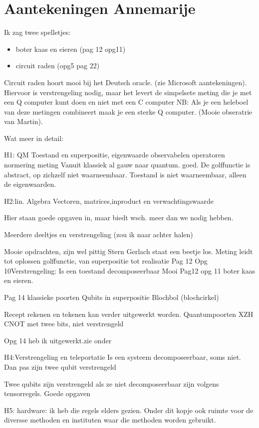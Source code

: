 \documentclass[../../main.tex]{subfiles}
\begin{document}
\onlyinsubfile{\setcounter{chapter}{8}}
\notinsubfile{}
\chapter{Aantekeningen Annemarije}

Ik zag twee spelletjes: 
\begin{itemize}[nosep]
\item boter kaas en eieren (pag 12 opg11)
\item circuit raden (opg5 pag 22)
\end{itemize}

Circuit raden hoort mooi bij het Deutsch oracle. (zie Microsoft aantekeningen). Hiervoor is verstrengeling nodig, maar het levert de simpelsete meting die je met een Q computer kunt doen en niet met een C computer
NB: Als je een heleboel van deze metingen combineert maak je een sterke Q computer. (Mooie obseratrie van Martin).


Wat meer in detail:

H1: QM
Toestand en superpositie, eigenwaarde observabelen operatoren normering meting
Vanuit klassiek al gauw naar quantum. goed.
De golffunctie is abstract, op zichzelf niet waarneembaar. Toestand is niet waarneembaar, alleen de eigenwaarden.

H2:lin. Algebra
Vectoren, matrices,inproduct en verwachtingswaarde

Hier staan goede opgaven in, maar biedt wsch. meer dan we nodig hebben.

Meerdere deeltjes en verstrengeling (zou ik naar achter halen)

Mooie opdrachten, zijn wel pittig
Stern Gerlach staat een beetje los. Meting leidt tot oplossen golffunctie, van superpositie tot realisatie
Pag 12 Opg 10Verstrengeling: Is een toestand decomposeerbaar Mooi
Pag12 opg 11 boter kaas en eieren.

Pag 14 klassieke poorten
Qubits in superpositie
Blochbol (blochcirkel)

Recept rekenen en tekenen kan verder uitgewerkt worden.
Quantumpoorten XZH
CNOT met twee bits, niet verstrengeld

Opg 14 heb ik uitgewerkt.zie onder

H4:Verstrengeling en teleportatie
Is een systeem decomposeerbaar, soms niet. Dan pas zijn twee qubit verstrengeld

Twee qubits zijn verstrengeld als ze niet decomposeerbaar zijn volgens tensorregels.
Goede opgaven

H5: hardware: ik heb die regels elders gezien. Onder dit kopje ook ruimte voor de diversse methoden en instituten waar die methoden worden gebruikt.
\end{document}
